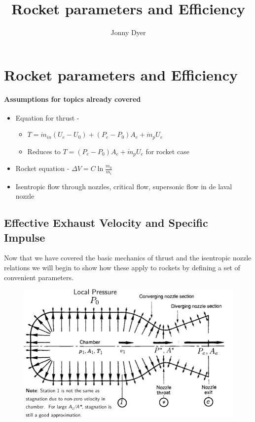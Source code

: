 \documentclass[twocolumn]{memoir} %
\title{Rocket parameters and Efficiency}
\author{Jonny Dyer}
\begin{document}
\chapter*{Rocket parameters and Efficiency}

\subsubsection{Assumptions for topics already
covered}\label{assumptions-for-topics-already-covered}

\begin{itemize}
\item
  Equation for thrust -

  \begin{itemize}
  \item
    $T = \dot{m}_{in}(U_e - U_0) + (P_e - P_0)A_e + \dot{m}_pU_e$
  \item
    Reduces to $T = (P_e - P_0)A_e + \dot{m}_pU_e$ for rocket case
  \end{itemize}
\item
  Rocket equation - $\Delta V = C \ln \frac{m_0}{m_i}$
\item
  Isentropic flow through nozzles, critical flow, supersonic flow in de
  laval nozzle
\end{itemize}

\section{Effective Exhaust Velocity and Specific Impulse}\label{c-and-isp}

Now that we have covered the basic mechanics of thrust and the
isentropic nozzle relations we will begin to show how these apply to
rockets by defining a set of convenient parameters.

\begin{figure}[H]
    \centering
    \includegraphics*[width=0.95\columnwidth]{imgs/nozzle_pressure}
\end{figure}
\end{document}
